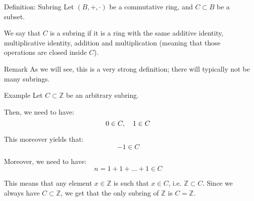 \documentclass[a4paper]{article}
\begin{document}
\begin{parag}{Definition: Subring}
    Let $\left(B, +, \cdot \right)$ be a commutative ring, and $C \subset B$ be a subset.

    We say that $C$ is a subring if it is a ring with the same additive identity, multiplicative identity, addition and multiplication (meaning that those operations are closed inside $C$).

    \begin{subparag}{Remark}
        As we will see, this is a very strong definition; there will typically not be many subrings.
    \end{subparag}
\end{parag}

\begin{parag}{Example}
    Let $C \subset \mathbb{Z}$ be an arbitrary subring. 

    Then, we need to have: 
    \[0 \in C, \quad 1 \in C\]

    This moreover yields that: 
    \[-1 \in C\]
    
    Moreover, we need to have: 
    \[n = 1 + 1 + \ldots + 1 \in C\]
    
    This means that any element $x \in \mathbb{Z}$ is such that $x \in C$, i.e. $\mathbb{Z} \subset C$. Since we always have $C \subset \mathbb{Z}$, we get that the only subring of $\mathbb{Z}$ is $C = \mathbb{Z}$.
\end{parag}
\end{document}
